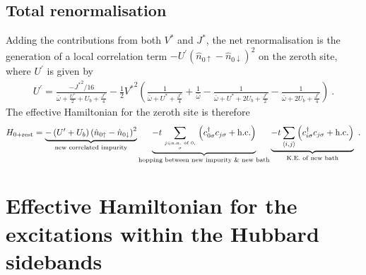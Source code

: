 \documentclass{iopart}
\begin{document}
\subsection{Total renormalisation}
Adding the contributions from both \(V^*\) and \(J^*\),  the net renormalisation is the generation of a local correlation term \(-U^\prime\left(\hat n_{ 0\uparrow} - \hat n_{0 \downarrow}\right)^2\) on the zeroth site, where \(U^\prime\) is given by
\begin{eqnarray}
	U^\prime = \frac{-{J^*}^2/16}{\bar\omega + \frac{U^*}{2} + U_b + \frac{J^*}{4}} - \frac{1}{2}{V^*}^2\left(\frac{1}{\bar\omega + U^* + \frac{J^*}{4}} + \frac{1}{\bar\omega} - \frac{1}{\bar\omega + U^* + 2U_b + \frac{J^*}{2}} - \frac{1}{\bar\omega + 2U_b + \frac{J^*}{4}}\right)~.
\end{eqnarray}
The effective Hamiltonian for the zeroth site is therefore
\begin{eqnarray}
	H_\text{0+rest} = \underbrace{-\left(U^\prime + U_b\right)\left(\hat n_{0\uparrow} - \hat n_{0\downarrow}\right)^2}_\text{new correlated impurity} \underbrace{- t\sum_{j\in \text{n.n. of 0},\atop{\sigma}}\left(c^\dagger_{0\sigma}c_{j\sigma} + \text{h.c.}\right)}_\text{hopping between new impurity \& new bath} \underbrace{-t \sum_{\left<i,j \right>}\left(c^\dagger_{i\sigma}c_{j\sigma} + \text{h.c.}\right)}_\text{K.E. of new bath}~.
\end{eqnarray}

\section{Effective Hamiltonian for the excitations within the Hubbard sidebands}
\end{document}
